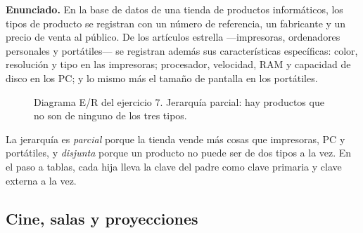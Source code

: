\textbf{Enunciado.} En la base de datos de una tienda de productos informáticos,
los tipos de producto se registran con un número de referencia, un fabricante y
un precio de venta al público. De los artículos estrella —impresoras,
ordenadores personales y portátiles— se registran además sus características
específicas: color, resolución y tipo en las impresoras; procesador, velocidad,
RAM y capacidad de disco en los PC; y lo mismo más el tamaño de pantalla en los
portátiles.

\begin{figure}[H]
\centering
{}
\caption{Diagrama E/R del ejercicio 7. Jerarquía parcial: hay productos que no
son de ninguno de los tres tipos.}
\end{figure}

La jerarquía es \emph{parcial} porque la tienda vende más cosas que impresoras,
PC y portátiles, y \emph{disjunta} porque un producto no puede ser de dos tipos
a la vez. En el paso a tablas, cada hija lleva la clave del padre como clave
primaria y clave externa a la vez.

\subsection{Cine, salas y proyecciones}

